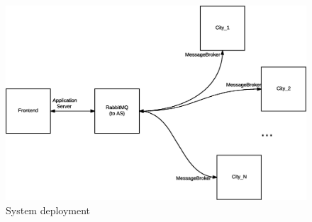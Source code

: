 \begin{figure}[H]
  \centering
  \includegraphics[scale=0.5,keepaspectratio]
    {images/overall/deployment.eps}
  \caption{System deployment}
  \label{fig:ovrl-deployment}
\end{figure}
